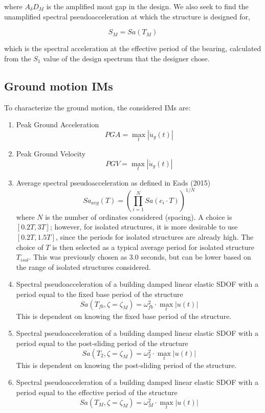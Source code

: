 \documentclass{article}
\begin{document}
where $A_\delta D_M$ is the amplified moat gap in the design. We also seek to find the unamplified spectral pseudoacceleration at which the structure is designed for,

	$$S_M = Sa(T_M)$$
	
which is the spectral acceleration at the effective period of the bearing, calculated from the $S_1$ value of the design spectrum that the designer chose.

\subsection{Ground motion IMs}
To characterize the ground motion, the considered IMs are:

	\begin{enumerate}
		\item Peak Ground Acceleration 
			$$PGA = \max_t \left | \ddot{u}_g(t) \right |$$
		\item Peak Ground Velocity 
			$$PGV = \max_t \left | \dot{u}_g(t) \right |$$
		\item Average spectral pseudoacceleration as defined in Eads (2015)
			$$Sa_{avg}(T) = \left ( \prod_{i=1}^N Sa (c_i \cdot T) \right ) ^ {1/N}$$
		where $N$ is the number of ordinates considered (spacing). A choice is $[0.2 T, 3T]$; however, for isolated structures, it is more desirable to use $[0.2 T, 1.5 T]$, since the periods for isolated structures are already high. The choice of $T$ is then selected as a typical average period for isolated structure $T_{isol}$. This was previously chosen as 3.0 seconds, but can be lower based on the range of isolated structures considered.
		\item Spectral pseudoacceleration of a building damped linear elastic SDOF with a period equal to the fixed base period of the structure
			$$Sa(T_{fb}, \zeta = \zeta_M) = \omega_{fb}^2 \cdot \max_t \left | u(t) \right | $$
		This is dependent on knowing the fixed base period of the structure.
		\item Spectral pseudoacceleration of a building damped linear elastic SDOF with a period equal to the post-sliding period of the structure
			$$Sa(T_2, \zeta = \zeta_M) = \omega_2^2 \cdot \max_t \left | u(t) \right | $$
		This is dependent on knowing the post-sliding period of the structure.
		\item Spectral pseudoacceleration of a building damped linear elastic SDOF with a period equal to the effective period of the structure
			$$Sa(T_M, \zeta = \zeta_M) = \omega_M^2 \cdot \max_t \left | u(t) \right | $$

\end{enumerate}
\end{document}
